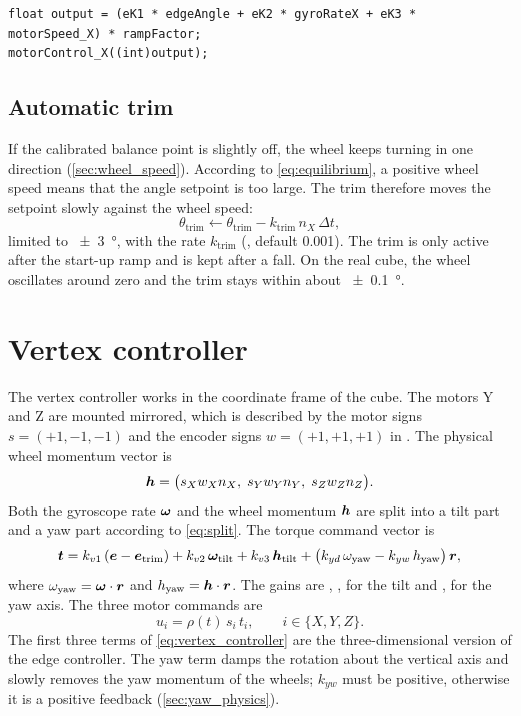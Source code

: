 \begin{lstlisting}[caption={Edge controller in \cmd{cubilox\_mk1.ino}.}, label={lst:edge}]
float output = (eK1 * edgeAngle + eK2 * gyroRateX + eK3 * motorSpeed_X) * rampFactor;
motorControl_X((int)output);
\end{lstlisting}

\subsection{Automatic trim}
\label{sec:trim}

If the calibrated balance point is slightly off, the wheel keeps turning in one direction
(\cref{sec:wheel_speed}). According to \cref{eq:equilibrium}, a positive wheel speed means that the
angle setpoint is too large. The trim therefore moves the setpoint slowly against the wheel speed:
\begin{equation}
  \theta_\text{trim} \leftarrow \theta_\text{trim} - k_\text{trim}\, n_X\, \Delta t ,
\end{equation}
limited to \SI{\pm 3}{\degree}, with the rate $k_\text{trim}$ (, default 0.001). The trim
is only active after the start-up ramp and is kept after a fall. On the real cube, the wheel
oscillates around zero and the trim stays within about \SI{\pm 0.1}{\degree}.

\section{Vertex controller}
\label{sec:vertex_controller}

The vertex controller works in the coordinate frame of the cube. The motors Y and Z are mounted
mirrored, which is described by the motor signs $s = (+1, -1, -1)$ and the encoder signs
$w = (+1, +1, +1)$ in . The physical wheel momentum vector is
\begin{equation}
  \bm{h} = \bigl(s_X w_X n_X,\; s_Y w_Y n_Y,\; s_Z w_Z n_Z\bigr).
\end{equation}
Both the gyroscope rate $\bm{\omega}$ and the wheel momentum $\bm{h}$ are split into a tilt part
and a yaw part according to \cref{eq:split}. The torque command vector is
\begin{equation}
  \bm{t} = k_{v1}\,(\bm{e} - \bm{e}_\text{trim}) + k_{v2}\,\bm{\omega}_\text{tilt}
           + k_{v3}\,\bm{h}_\text{tilt}
           + \bigl(k_{yd}\,\omega_\text{yaw} - k_{yw}\,h_\text{yaw}\bigr)\,\bm{r},
  \label{eq:vertex_controller}
\end{equation}
where $\omega_\text{yaw} = \bm{\omega}\cdot\bm{r}$ and $h_\text{yaw} = \bm{h}\cdot\bm{r}$.
The gains are , ,  for the tilt and ,  for the yaw
axis. The three motor commands are
\begin{equation}
  u_i = \rho(t)\, s_i\, t_i ,\qquad i \in \{X, Y, Z\}.
\end{equation}
The first three terms of \cref{eq:vertex_controller} are the three-dimensional version of the edge
controller. The yaw term damps the rotation about the vertical axis and slowly removes the yaw
momentum of the wheels; $k_{yw}$ must be positive, otherwise it is a positive feedback
(\cref{sec:yaw_physics}).

